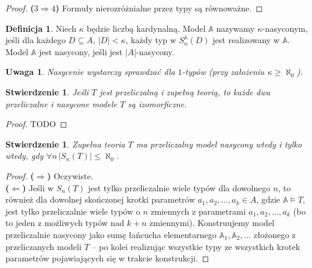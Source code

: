 \documentclass{article}
\newcommand{\A}{\mathbb{A}}
\theoremstyle{plain}
\newtheorem{stw}[thm]{Stwierdzenie}
\newtheorem{uw}[thm]{Uwaga}
\theoremstyle{definition}
\newtheorem{df}[thm]{Definicja}
\theoremstyle{remark}
\begin{document}
\begin{proof}
	\textbf{($3 \Rightarrow 4$)}
	Formuły nierozróżnialne przez typy są równoważne.
\end{proof}


\begin{df}
	 Niech $\kappa$ będzie liczbą kardynalną.
	 Model $\A$ nazywamy $\kappa$-nasyconym, jeśli dla każdego $D \subseteq A$, $|D| < \kappa$, każdy typ w $S^{\A}_n(D)$ jest realizowany w $\A$.
	Model $\A$ jest nasycony, jeśli jest $|A|$-nasycony.
\end{df}

\begin{uw}
	Nasycenie wystarczy sprawdzać dla $1$-typów (przy założeniu $\kappa \geq \aleph_0$).
\end{uw}

\begin{stw}
	 Jeśli $T$ jest przeliczalną i zupełną teorią, to każde dwa przeliczalne i nasycone modele $T$ są izomorficzne.
\end{stw}
\begin{proof}
	 TODO
\end{proof}
\begin{stw}
	Zupełna teoria $T$ ma przeliczalny model nasycony wtedy i tylko wtedy, gdy $\forall n \,|S_n(T)| \leq \aleph_0$.
\end{stw}
\begin{proof}
	 \textbf{($\Rightarrow$)} Oczywiste.
	 \\\textbf{($\Leftarrow$)} Jeśli w $S_n(T)$ jest tylko przeliczalnie wiele typów dla dowolnego $n$, to również dla dowolnej skończonej krotki parametrów $a_1, a_2, \ldots, a_k \in A$, gdzie $\A \models T$, jest tylko przeliczalnie wiele typów o $n$ zmiennych z parametrami $a_1, a_2, \ldots, a_k$ (bo to jeden z możliwych typów nad $k+n$ zmiennymi).
	 Konstruujemy model przeliczalnie nasycony jako sumę łańcucha elementarnego $\A_1, \A_2, \ldots$ złożonego z przeliczanych modeli $T$ -- po kolei realizując wszystkie typy ze wszystkich krotek parametrów pojawiających się w trakcie konstrukcji.

\end{proof}
\end{document}

